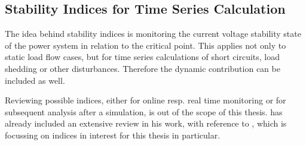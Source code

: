 \subsection{Stability Indices for Time Series Calculation}
\label{sec:stability-indices}

The idea behind stability indices is monitoring the current voltage stability state of the power system in relation to the critical point. This applies not only to static load flow cases, but for time series calculations of short circuits, load shedding or other disturbances. Therefore the dynamic contribution can be included as well. \quelle

Reviewing possible indices, either for online resp. real time monitoring or for subsequent analysis after a simulation, is out of the scope of this thesis. \textcite{danishVoltageStabilityElectric2015} has already included an extensive review in his work, with reference to \textcite{doigcardetAnalysisVoltageStability2010}, which is focussing on indices in interest for this thesis in particular. 

